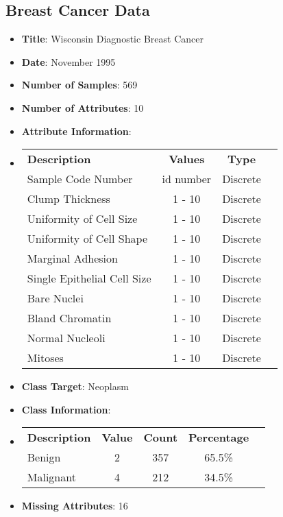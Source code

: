 \documentclass[11pt,titlepage]{article}
\newcommand{\bb}{\textbf}
\begin{document}
\subsection{Breast Cancer Data}
\begin{itemize}[leftmargin=*]
  \item[] \bb{Title}: Wisconsin Diagnostic Breast Cancer
  \item[] \bb{Date}: November 1995
  \item[] \bb{Number of Samples}: 569
  \item[] \bb{Number of Attributes}: 10
  \item[] \bb{Attribute Information}:
  \item[]
  \begin{tabular}{l c c c }
    \bb{Description}             & \bb{Values} & \bb{Type} \\
    Sample Code Number           & id number   & Discrete  \\
    Clump Thickness              & 1 - 10      & Discrete  \\
    Uniformity of Cell Size      & 1 - 10      & Discrete  \\
    Uniformity of Cell Shape     & 1 - 10      & Discrete  \\
    Marginal Adhesion            & 1 - 10      & Discrete  \\
    Single Epithelial Cell Size  & 1 - 10      & Discrete  \\
    Bare Nuclei                  & 1 - 10      & Discrete  \\
    Bland Chromatin              & 1 - 10      & Discrete  \\
    Normal Nucleoli              & 1 - 10      & Discrete  \\
    Mitoses                      & 1 - 10      & Discrete
  \end{tabular}
  \item[] \bb{Class Target}: Neoplasm
  \item[] \bb{Class Information}:
  \item[]
  \begin{tabular}{l c c c c }
    \bb{Description} & \bb{Value} & \bb{Count} & \bb{Percentage} \\
    Benign           & 2          & 357        & 65.5\%          \\
    Malignant        & 4          & 212        & 34.5\%
  \end{tabular}
  \item[] \bb{Missing Attributes}: 16
\end{itemize}
\end{document}

